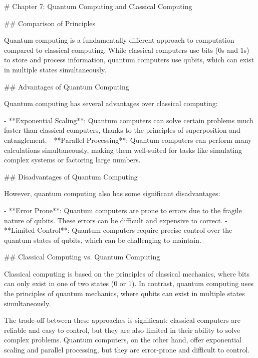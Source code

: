 # Chapter 7: Quantum Computing and Classical Computing

## Comparison of Principles

Quantum computing is a fundamentally different approach to computation compared to classical computing. While classical computers use bits (0s and 1s) to store and process information, quantum computers use qubits, which can exist in multiple states simultaneously.

## Advantages of Quantum Computing

Quantum computing has several advantages over classical computing:

- **Exponential Scaling**: Quantum computers can solve certain problems much faster than classical computers, thanks to the principles of superposition and entanglement.
- **Parallel Processing**: Quantum computers can perform many calculations simultaneously, making them well-suited for tasks like simulating complex systems or factoring large numbers.

## Disadvantages of Quantum Computing

However, quantum computing also has some significant disadvantages:

- **Error Prone**: Quantum computers are prone to errors due to the fragile nature of qubits. These errors can be difficult and expensive to correct.
- **Limited Control**: Quantum computers require precise control over the quantum states of qubits, which can be challenging to maintain.

## Classical Computing vs. Quantum Computing

Classical computing is based on the principles of classical mechanics, where bits can only exist in one of two states (0 or 1). In contrast, quantum computing uses the principles of quantum mechanics, where qubits can exist in multiple states simultaneously.

The trade-off between these approaches is significant: classical computers are reliable and easy to control, but they are also limited in their ability to solve complex problems. Quantum computers, on the other hand, offer exponential scaling and parallel processing, but they are error-prone and difficult to control.